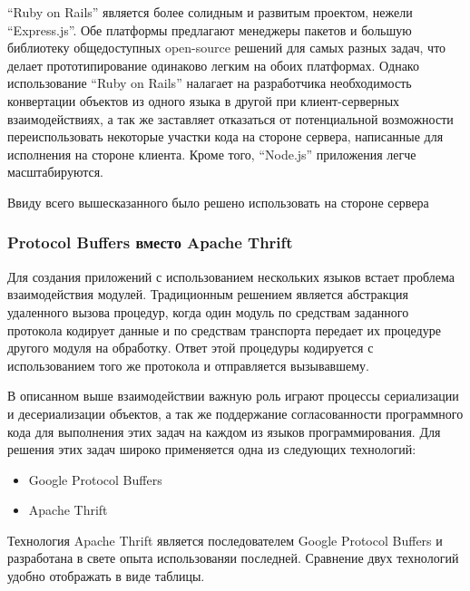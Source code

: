 \documentclass[12pt, a4paper]{article}
\begin{document}
``Ruby on Rails'' является более солидным и развитым проектом, нежели
``Express.js''. Обе платформы предлагают менеджеры пакетов и большую библиотеку
общедоступных open-source решений для самых разных задач, что делает
прототипирование одинаково легким на обоих платформах. Однако использование
``Ruby on Rails'' налагает на разработчика необходимость конвертации объектов из
одного языка в другой при клиент-серверных взаимодействиях, а так же заставляет
отказаться от потенциальной возможности переиспользовать некоторые участки кода
на стороне сервера, написанные для исполнения на стороне клиента. Кроме того,
``Node.js'' приложения легче масштабируются.

Ввиду всего вышесказанного было решено использовать  на
стороне сервера

\subsubsection{Protocol Buffers вместо Apache Thrift}

Для создания приложений с использованием нескольких языков встает проблема
взаимодействия модулей. Традиционным решением является абстракция удаленного
вызова процедур, когда один модуль по средствам заданного протокола кодирует
данные и по средствам транспорта передает их процедуре другого модуля на
обработку. Ответ этой процедуры
кодируется с использованием того же протокола и отправляется вызывавшему.

В описанном выше взаимодействии важную роль играют процессы сериализации и
десериализации
объектов, а так же поддержание согласованности программного кода для выполнения
этих задач на каждом из языков программирования. Для решения этих задач широко
применяется одна из следующих технологий:

\begin{itemize}
    \item Google Protocol Buffers
    \item Apache Thrift
\end{itemize}

Технология Apache Thrift является последователем Google
Protocol Buffers и разработана в свете опыта использованяи последней. Сравнение
двух технологий удобно отображать в виде таблицы.

\begin{center}
\end{center}
\end{document}
